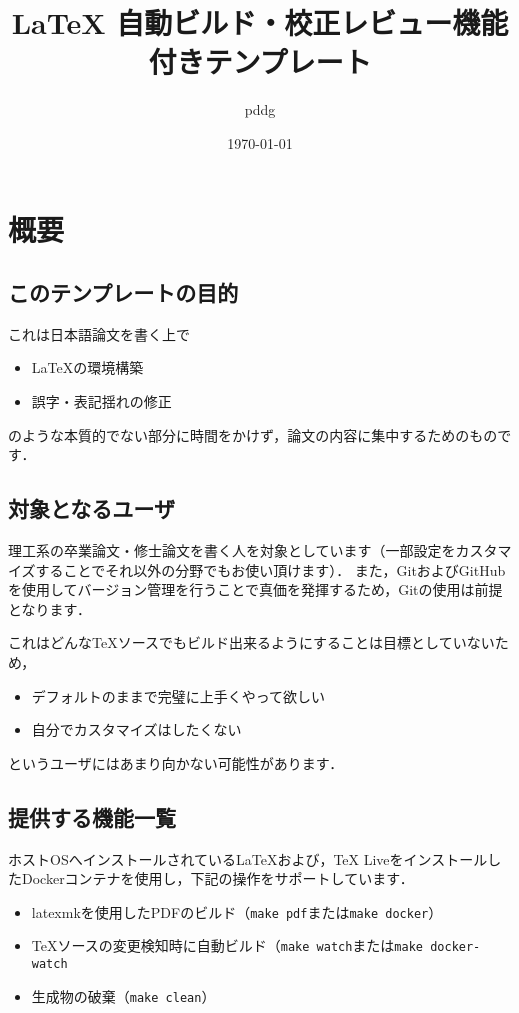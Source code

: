 \documentclass{jsarticle}
\title{ {\LaTeX} 自動ビルド・校正レビュー機能付きテンプレート}
\author{pddg}
\date{\today}
\newcommand{\code}[1]{\texttt{#1}}
\begin{document}
\maketitle

\section{概要}

\subsection{このテンプレートの目的}

これは日本語論文を書く上で

\begin{itemize}
    \item LaTeXの環境構築
    \item 誤字・表記揺れの修正
\end{itemize}

のような本質的でない部分に時間をかけず，論文の内容に集中するためのものです．

\subsection{対象となるユーザ}
理工系の卒業論文・修士論文を書く人を対象としています（一部設定をカスタマイズすることでそれ以外の分野でもお使い頂けます）．
また，GitおよびGitHubを使用してバージョン管理を行うことで真価を発揮するため，Gitの使用は前提となります．


これはどんなTeXソースでもビルド出来るようにすることは目標としていないため，

\begin{itemize}
    \item デフォルトのままで完璧に上手くやって欲しい
    \item 自分でカスタマイズはしたくない
\end{itemize}

というユーザにはあまり向かない可能性があります．

\subsection{提供する機能一覧}

ホストOSへインストールされているLaTeXおよび，TeX LiveをインストールしたDockerコンテナを使用し，下記の操作をサポートしています．

\begin{itemize}
    \item latexmkを使用したPDFのビルド（\code{make pdf}または\code{make docker}）
    \item TeXソースの変更検知時に自動ビルド（\code{make watch}または\code{make docker-watch}
    \item 生成物の破棄（\code{make clean}）
\end{itemize}
\end{document}

